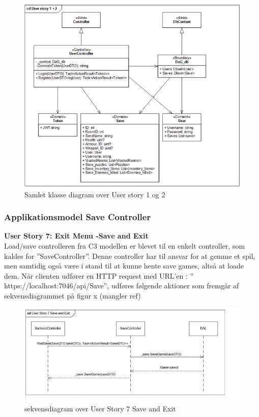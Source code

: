 \begin{figure}[H]
\centering
\includegraphics[width = \textwidth]{02-Body/Images/Backend_klasse_1_2.PNG}
\caption{Samlet klasse diagram over User story 1 og 2}
\label{fig:Design-Backend-Klasse-1-2}
\end{figure}

\subsubsection{Applikationsmodel Save Controller}
\textbf{User Story 7: Exit Menu -\g Save and Exit}\\
Load/save controlleren fra C3 modellen er blevet til en enkelt controller, som kaldes for ”SaveController”. Denne controller har til ansvar for at gemme et spil, men samtidig også være i stand til at kunne hente save games, altså at loade dem.
Når clienten udfører en HTTP request med URL’en : ” https://localhost:7046/api/Save”, udføres følgende aktioner som fremgår af sekvensdiagrammet på figur x (mangler ref)\\

\begin{figure}[H]
\centering
\includegraphics[width = \textwidth]{02-Body/Images/Backend_sekvens_7.PNG}
\caption{sekvensdiagram over User Story 7 Save and Exit}
\label{fig:Design-Backend-Sekvens-7}
\end{figure}

